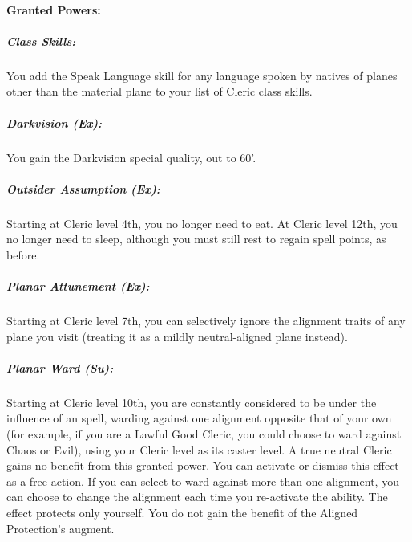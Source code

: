 \paragraph{Granted Powers:}
\subparagraph{Class Skills:} You add the Speak Language skill for any language spoken by natives of planes other than the material plane to your list of Cleric class skills.
\subparagraph{Darkvision (Ex):} 
You gain the Darkvision special quality, out to 60'. 
\subparagraph{Outsider Assumption (Ex):}
Starting at Cleric level 4th, you no longer need to eat. At Cleric level 12th, you no longer need to sleep, although you must still rest to regain spell points, as before.
\subparagraph{Planar Attunement (Ex):}
Starting at Cleric level 7th, you can selectively ignore the alignment traits of any plane you visit (treating it as a mildly neutral-aligned plane instead).
\subparagraph{Planar Ward (Su):}
Starting at Cleric level 10th, you are constantly considered to be under the influence of an  spell, warding against one alignment opposite that of your own (for example, if you are a Lawful Good Cleric, you could choose to ward against Chaos or Evil), using your Cleric level as its caster level. A true neutral Cleric gains no benefit from this granted power.
You can activate or dismiss this effect as a free action. If you can select to ward against more than one alignment, you can choose to change the alignment each time you re-activate the ability.
The effect protects only yourself. You do not gain the benefit of the Aligned Protection's augment.

